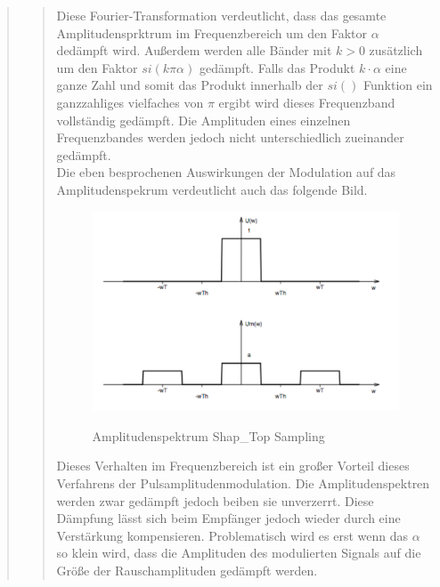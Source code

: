 \begin{quote}
\begin{quote}
        Diese Fourier-Transformation verdeutlicht, dass das gesamte Amplitudensprktrum im Frequenzbereich um den Faktor
        $\alpha$ dedämpft wird. Außerdem werden alle Bänder mit $k > 0$ zusätzlich um den Faktor $si(k \pi \alpha)$
        gedämpft. Falls das Produkt $k \cdot \alpha$ eine ganze Zahl und somit das Produkt innerhalb der $si()$ Funktion
        ein ganzzahliges vielfaches von $\pi$ ergibt wird dieses Frequenzband vollständig gedämpft. Die Amplituden eines
        einzelnen Frequenzbandes werden jedoch nicht unterschiedlich zueinander gedämpft.\\
        
        Die eben besprochenen Auswirkungen der Modulation auf das Amplitudenspekrum verdeutlicht auch das folgende Bild.
        
        \begin{figure}[H]
        \centering
            \includegraphics[scale=0.7, trim = 0cm 0cm 0cm 0cm, clip]{./Bilder/AmplitudenspektrumShap_Top}
                \caption{Amplitudenspektrum Shap_Top Sampling}
                \cite{AmplitudenspektrumShap_Top}
        \end{figure}
        
        Dieses Verhalten im Frequenzbereich ist ein großer Vorteil dieses Verfahrens der Pulsamplitudenmodulation. Die
        Amplitudenspektren werden zwar gedämpft jedoch beiben sie unverzerrt. Diese Dämpfung lässt sich beim Empfänger
        jedoch wieder durch eine Verstärkung kompensieren. Problematisch wird es erst wenn das $\alpha$ so klein wird,
        dass die Amplituden des modulierten Signals auf die Größe der Rauschamplituden gedämpft werden.\vspace{1em}
        

\end{quote}
\end{quote}
